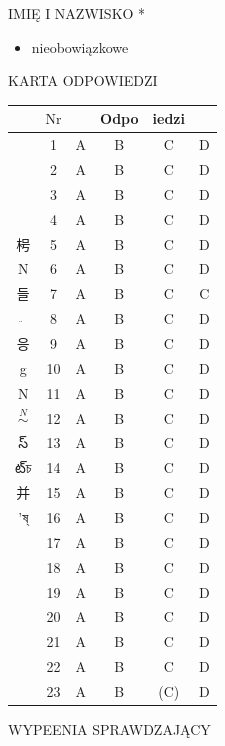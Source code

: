 \documentclass[10pt]{article}
\begin{document}
IMIĘ I NAZWISKO *

\begin{itemize}
  \item nieobowiązkowe
\end{itemize}

KARTA ODPOWIEDZI

\begin{center}
\begin{tabular}{|c|c|c|c|c|c|}
\hline
 & \( \mathrm{Nr} \) &  & Odpo & iedzi &  \\
\hline
 & 1 & A & B & C & D \\
\hline
 & 2 & A & B & C & D \\
\hline
 & 3 & A & B & C & D \\
\hline
 & 4 & A & B & C & D \\
\hline
枵 & 5 & A & B & C & D \\
\hline
N & 6 & A & B & C & D \\
\hline
들 & 7 & A & B & C & C \\
\hline
\( \ddot{~} \) & 8 & A & B & C & D \\
\hline
응 & 9 & A & B & C & D \\
\hline
g & 10 & A & B & C & D \\
\hline
N & 11 & A & B & C & D \\
\hline
\( \stackrel{N}{\sim} \) & 12 & A & B & C & D \\
\hline
స్ & 13 & A & B & C & D \\
\hline
ట్চ & 14 & A & B & C & D \\
\hline
并 & 15 & A & B & C & D \\
\hline
'ষ্ & 16 & A & B & C & D \\
\hline
 & 17 & A & B & C & D \\
\hline
 & 18 & A & B & C & D \\
\hline
 & 19 & A & B & C & D \\
\hline
 & 20 & A & B & C & D \\
\hline
 & 21 & A & B & C & D \\
\hline
 & 22 & A & B & C & D \\
\hline
 & 23 & A & B & (C) & D \\
\hline
\end{tabular}
\end{center}

WYPEENIA SPRAWDZAJĄCY
\end{document}
